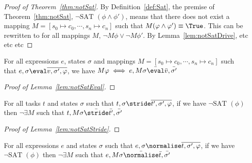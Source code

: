 
\onecolumn



\begin{proof}[Proof of Theorem~\ref{thm:notSat}]
  By Definition~\ref{def:Sat}, the premise of Theorem~\ref{thm:notSat}, $\neg\text{SAT }(\phi\land\phi')$,
  means that there does not exist a mapping $M=[s_0\mapsto c_0,\cdots,s_n\mapsto c_n]$ such that $M(\phi\land\phi')\equiv\True$.
  This can be rewritten to for all mappings $M$, $\neg M\phi \lor \neg M\phi'$.
  By Lemma~\ref{lem:notSatDrive}, etc etc etc 
\end{proof}

\begin{lemma}
  \label{lem:notSatEval}
  For all expressions $e$, states $\sigma$ and mappings $M=[s_0\mapsto c_0,\cdots,s_n\mapsto c_n]$ such that $e,\sigma\eval\overline{v,\sigma',\phi}$, we have $M\phi \iff e,M\sigma\bar{\eval}\bar{v},\bar{\sigma'}$

\end{lemma}

\begin{proof}[Proof of Lemma~\ref{lem:notSatEval}]

\end{proof}

\begin{lemma}
  \label{lem:notSatStride}
  For all tasks $t$ and states $\sigma$ such that $t,\sigma\stride\overline{t',\sigma',\phi}$, if we have $\neg\text{SAT }(\phi)$ then $\neg\exists M$ such that $t,M\sigma\bar{\stride}\bar{t'},\bar{\sigma'}$

\end{lemma}



\begin{proof}[Proof of Lemma~\ref{lem:notSatStride}]

\end{proof}

\begin{lemma}
  \label{lem:notSatNorm}
  For all expressions $e$ and states $\sigma$ such that $e,\sigma\normalise\overline{t,\sigma',\phi}$, if we have $\neg\text{SAT }(\phi)$ then $\neg\exists M$ such that $e,M\sigma\bar{\normalise}\bar{t},\bar{\sigma'}$

\end{lemma}



